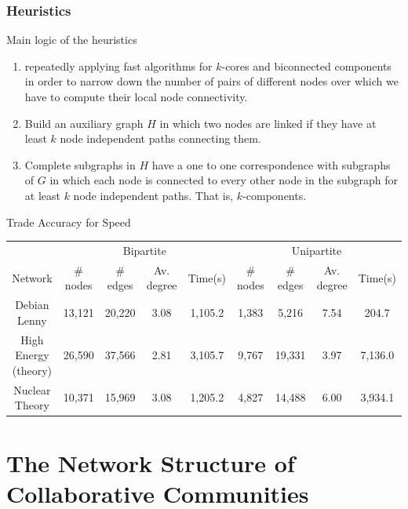 \documentclass[ignorenonframetext,red,8pt,notes=show]{beamer}
\begin{document}
\begin{frame}
\frametitle{Heuristics}

\begin{block}{Main logic of the heuristics}

\begin{enumerate}

\item repeatedly applying fast algorithms for $k$-cores \citep{batagelj:2011} and biconnected components \citep{tarjan:1972} in order to narrow down the number of pairs of different nodes over which we have to compute their local node connectivity.

\item Build an auxiliary graph $H$ in which two nodes are linked if they have at least $k$ node independent paths connecting them.

\item Complete subgraphs in $H$ have a one to one correspondence with subgraphs of $G$ in which each node is connected to every other node in the subgraph for at least $k$ node independent paths. That is, $k$-components.

\end{enumerate}
\end{block}

\begin{block}{Trade Accuracy for Speed}
\begin{tiny}
\begin{tabular}{|c|c|c|c|c|c|c|c|c|}
\hline
&\multicolumn{4}{|c|}{Bipartite}&\multicolumn{4}{|c|}{Unipartite}\\
Network&\# nodes&\# edges&Av. degree&Time(s)&\# nodes&\# edges&Av. degree&Time(s)\\
\hline
Debian Lenny&13,121&20,220&3.08&1,105.2&1,383&5,216&7.54&204.7\\
High Energy (theory)&26,590&37,566&2.81&3,105.7&9,767&19,331&3.97&7,136.0\\
Nuclear Theory&10,371&15,969&3.08&1,205.2&4,827&14,488&6.00&3,934.1\\
\hline
\end{tabular}
\end{tiny}
\end{block}

\end{frame}



\section{The Network Structure of Collaborative Communities}
\end{document}
